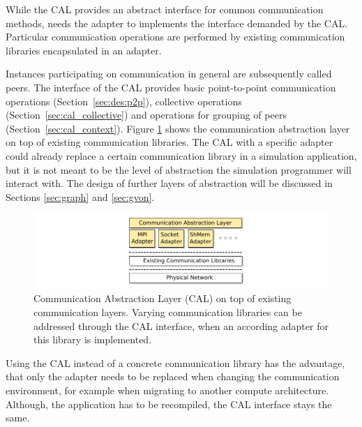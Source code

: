 While the CAL provides an abstract interface for common communication
methods, needs the adapter to implements the interface demanded by the CAL.
Particular communication operations are performed by existing
communication libraries encapsulated in an adapter.

Instances participating on communication in general are subsequently
called peers.  The interface of the CAL provides basic point-to-point
communication operations (Section~\ref{sec:des:p2p}), collective
operations (Section~\ref{sec:cal_collective}) and operations for
grouping of peers (Section~\ref{sec:cal_context}).  Figure
\ref{fig:cal} shows the communication abstraction layer on top of
existing communication libraries.  The CAL with a specific adapter
could already replace a certain communication library in a simulation
application, but it is not meant to be the level of abstraction the
simulation programmer will interact with. The design of further layers
of abstraction will be discussed in Sections \ref{sec:graph} and
\ref{sec:gvon}.

\begin{figure}[H]
  \centering
  \includegraphics[width=\textwidth]{graphics/30_design_cal}
  \caption{Communication Abstraction Layer (CAL) on top of existing
    communication layers. Varying communication libraries can be
    addressed through the CAL interface, when an according adapter for
    this library is implemented.}
  \label{fig:cal}
\end{figure}


Using the CAL instead of a concrete communication library has
the advantage, that only the adapter needs to be replaced when
changing the communication environment, for example when migrating
to another compute architecture. Although, the application has
to be recompiled, the CAL interface stays the same.




